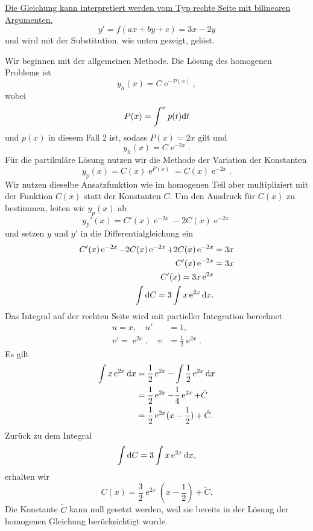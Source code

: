 {\begin{itemize}
\underline{Die Gleichung kann interpretiert werden vom Typ rechte Seite mit bilinearen}\\
\underline{Argumenten.}
$$
y'=f(ax+by+c)=3x-2y
$$
und wird mit der Substitution, wie unten gezeigt, gelöst.

Wir beginnen mit der allgemeinen Methode. Die Lösung des homogenen Problems ist
$$
y_h(x) = C \operatorname{e}^{-P(x)},
$$
wobei
$$
P(x) = \int^x p(t) \mathrm{d} t
$$
und $p(x)$ in diesem Fall 2 ist, sodass $P(x) = 2x$ gilt und
$$
y_h(x) = C\operatorname{e}^{-2x}.
$$
Für die partikuläre Lösung nutzen wir die Methode der Variation der Konstanten
$$
y_p(x) = C(x) \operatorname{e}^{P(x)} = C(x) \operatorname{e}^{-2x}.
$$
Wir nutzen dieselbe Ansatzfunktion wie im homogenen Teil aber multipliziert mit der 
Funktion $C(x)$ statt der Konstanten $C$.
Um den Ausdruck für $C(x)$ zu bestimmen, leiten wir $y_p(x)$ ab
$$
y_p'(x) = C'(x) \operatorname{e}^{-2x} -2 C(x) \operatorname{e}^{-2x}
$$
und setzen $y$ und $y'$ in die Differentialgleichung ein
\begin{align*}
C'(x) \operatorname{e}^{-2x} -2 C(x) \operatorname{e}^{-2x} + 2 C(x) \operatorname{e}^{-2x} &= 3x\\
C'(x) \operatorname{e}^{-2x} &= 3x\\
C'(x) = 3x \operatorname{e}^{2x}\\
\int \mathrm{d} C = 3 \int x \operatorname{e}^{2x} \mathrm{d} x.
\end{align*}
Das Integral auf der rechten Seite  wird mit partieller Integration berechnet
\begin{align*}
u=x, \quad u'&=1,\\
v'=\operatorname{e}^{2x}, \quad v&=\frac{1}{2}\operatorname{e}^{2x}.
\end{align*}
Es gilt
\begin{align*}
\int x \operatorname{e}^{2x} \mathrm{d} x &= \frac{1}{2} \operatorname{e}^{2x} - \int \frac{1}{2} \operatorname{e}^{2x} \mathrm{d} x\\
&= \frac{1}{2} \operatorname{e}^{2x} - \frac{1}{4} \operatorname{e}^{2x} + \tilde C\\
&= \frac{1}{2}\operatorname{e}^{2x} ( x - \frac{1}{2}) + \tilde C.
\end{align*}
Zurück zu dem Integral
$$
\int \mathrm{d} C = 3 \int x \operatorname{e}^{2x} \mathrm{d} x,
$$
erhalten wir
$$
C(x) = \frac{3}{2} \operatorname{e}^{2x} (x-\frac{1}{2}) + \tilde C.
$$
Die Konstante $\tilde C$ kann null gesetzt werden, weil sie bereits in der Lösung der 
homogenen Gleichung berücksichtigt wurde.


\end{itemize}}
